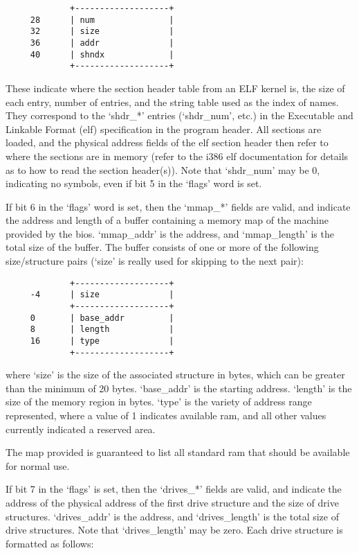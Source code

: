 \begin{verbatim}
             +-------------------+
     28      | num               |
     32      | size              |
     36      | addr              |
     40      | shndx             |
             +-------------------+
\end{verbatim}

These indicate where the section header table from an ELF kernel is, the size of
each entry, number of entries, and the string table used as the index of names.
They correspond to the ‘shdr\_*’ entries (‘shdr\_num’, etc.) in the Executable
and Linkable Format (elf) specification in the program header. All sections are
loaded, and the physical address fields of the elf section header then refer to
where the sections are in memory (refer to the i386 elf documentation for
details as to how to read the section header(s)). Note that ‘shdr\_num’ may be
0, indicating no symbols, even if bit 5 in the ‘flags’ word is set.

If bit 6 in the ‘flags’ word is set, then the ‘mmap\_*’ fields are valid, and
indicate the address and length of a buffer containing a memory map of the
machine provided by the bios. ‘mmap\_addr’ is the address, and ‘mmap\_length’ is
the total size of the buffer. The buffer consists of one or more of the
following size/structure pairs (‘size’ is really used for skipping to the next
pair):

\begin{verbatim}
             +-------------------+
     -4      | size              |
             +-------------------+
     0       | base_addr         |
     8       | length            |
     16      | type              |
             +-------------------+
\end{verbatim}

where ‘size’ is the size of the associated structure in bytes, which can be
greater than the minimum of 20 bytes. ‘base\_addr’ is the starting address.
‘length’ is the size of the memory region in bytes. ‘type’ is the variety of
address range represented, where a value of 1 indicates available ram, and all
other values currently indicated a reserved area.

The map provided is guaranteed to list all standard ram that should be available
for normal use.

If bit 7 in the ‘flags’ is set, then the ‘drives\_*’ fields are valid, and
indicate the address of the physical address of the first drive structure and
the size of drive structures. ‘drives\_addr’ is the address, and
‘drives\_length’ is the total size of drive structures. Note that
‘drives\_length’ may be zero. Each drive structure is formatted as follows:

